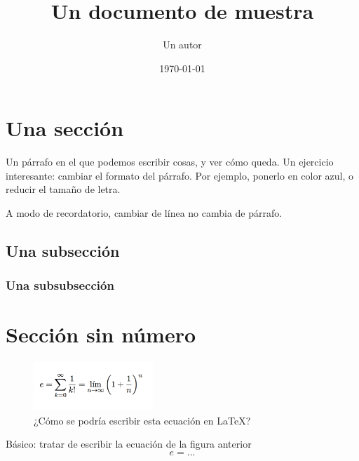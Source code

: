 \documentclass[11pt, a4paper]{article}
\title{Un documento de muestra}
\author{Un autor}
\date{\today}
\begin{document}
\maketitle

\setcounter{tocdepth}{2}

\tableofcontents

\section{Una sección}

Un párrafo en el que podemos escribir cosas, y ver cómo queda. Un ejercicio interesante: cambiar el formato del párrafo. Por ejemplo, ponerlo en color azul, o reducir el tamaño de letra.

A modo de recordatorio,
cambiar de línea
no cambia de párrafo.

\subsection{Una subsección}

\subsubsection{Una subsubsección}

\section*{Sección sin número}

\begin{figure}[hbtp]
\centering
\includegraphics[width = 0.4\textwidth]{Ecuacion.png}
\caption{¿Cómo se podría escribir esta ecuación en \LaTeX?}
\label{fig:ecuacion}
\end{figure}

Básico: tratar de escribir la ecuación de la figura anterior
\[ e = ... \]
\end{document}
